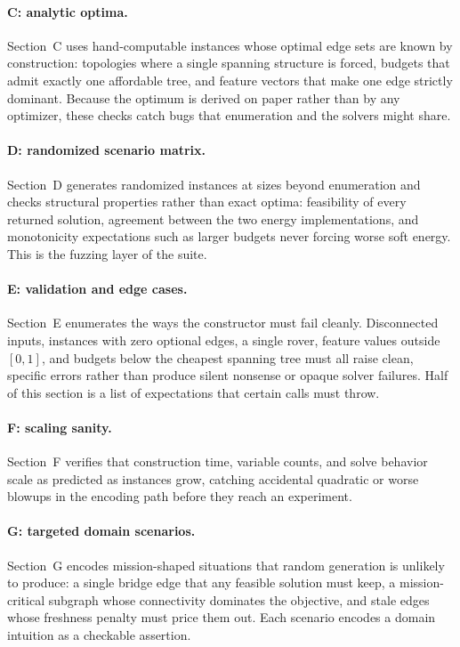 \paragraph{C: analytic optima.}
Section~C uses hand-computable instances whose optimal edge sets are known
by construction: topologies where a single spanning structure is forced,
budgets that admit exactly one affordable tree, and feature vectors that
make one edge strictly dominant. Because the optimum is derived on paper
rather than by any optimizer, these checks catch bugs that enumeration and
the solvers might share.

\paragraph{D: randomized scenario matrix.}
Section~D generates randomized instances at sizes beyond enumeration and
checks structural properties rather than exact optima: feasibility of every
returned solution, agreement between the two energy implementations, and
monotonicity expectations such as larger budgets never forcing worse soft
energy. This is the fuzzing layer of the suite.

\paragraph{E: validation and edge cases.}
Section~E enumerates the ways the constructor must fail cleanly.
Disconnected inputs, instances with zero optional edges, a single rover,
feature values outside $[0,1]$, and budgets below the cheapest spanning
tree must all raise clean, specific errors rather than produce silent
nonsense or opaque solver failures. Half of this section is a list of
expectations that certain calls must throw.

\paragraph{F: scaling sanity.}
Section~F verifies that construction time, variable counts, and solve
behavior scale as predicted as instances grow, catching accidental
quadratic or worse blowups in the encoding path before they reach an
experiment.

\paragraph{G: targeted domain scenarios.}
Section~G encodes mission-shaped situations that random generation is
unlikely to produce: a single bridge edge that any feasible solution must
keep, a mission-critical subgraph whose connectivity dominates the
objective, and stale edges whose freshness penalty must price them out.
Each scenario encodes a domain intuition as a checkable assertion.


